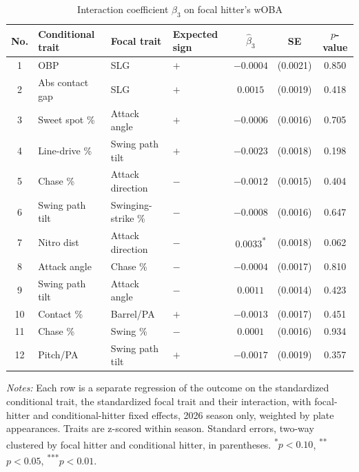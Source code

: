 \begin{table}[htbp]
\centering
\small
\caption{Interaction coefficient $\beta_3$ on focal hitter's wOBA}
\label{tab:table1_woba_2026}
\begin{tabular}{clllccc}
\toprule
No. & Conditional trait & Focal trait & Expected sign & $\hat\beta_3$ & SE & $p$-value \\
\midrule
1 & OBP & SLG & $+$ & $-0.0004$ & (0.0021) & 0.850 \\
2 & Abs contact gap & SLG & $+$ & $0.0015$ & (0.0019) & 0.418 \\
3 & Sweet spot \% & Attack angle & $+$ & $-0.0006$ & (0.0016) & 0.705 \\
4 & Line-drive \% & Swing path tilt & $+$ & $-0.0023$ & (0.0018) & 0.198 \\
5 & Chase \% & Attack direction & $-$ & $-0.0012$ & (0.0015) & 0.404 \\
6 & Swing path tilt & Swinging-strike \% & $-$ & $-0.0008$ & (0.0016) & 0.647 \\
7 & Nitro dist & Attack direction & $-$ & $0.0033$\textsuperscript{*} & (0.0018) & 0.062 \\
8 & Attack angle & Chase \% & $-$ & $-0.0004$ & (0.0017) & 0.810 \\
9 & Swing path tilt & Attack angle & $-$ & $0.0011$ & (0.0014) & 0.423 \\
10 & Contact \% & Barrel/PA & $+$ & $-0.0013$ & (0.0017) & 0.451 \\
11 & Chase \% & Swing \% & $-$ & $0.0001$ & (0.0016) & 0.934 \\
12 & Pitch/PA & Swing path tilt & $+$ & $-0.0017$ & (0.0019) & 0.357 \\
\bottomrule
\end{tabular}
\par\smallskip\parbox{0.95\textwidth}{\footnotesize \textit{Notes:} Each row is a separate regression of the outcome on the standardized conditional trait, the standardized focal trait and their interaction, with focal-hitter and conditional-hitter fixed effects, 2026 season only, weighted by plate appearances. Traits are z-scored within season. Standard errors, two-way clustered by focal hitter and conditional hitter, in parentheses. \textsuperscript{*}$p<0.10$, \textsuperscript{**}$p<0.05$, \textsuperscript{***}$p<0.01$.}
\end{table}
